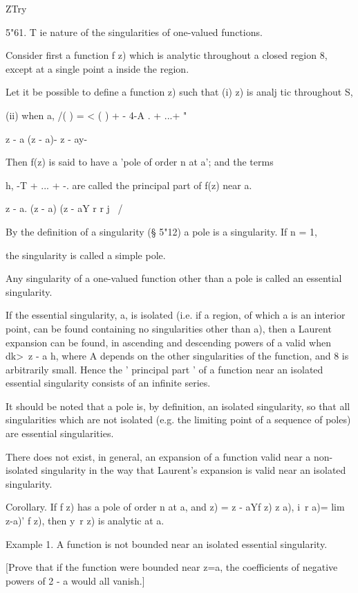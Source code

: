 {{{{ZTry

5"61. T ie nature of the singularities of one-valued functions.

Consider first a function f z) which is analytic throughout a closed
region 8, except at a single point a inside the region.

Let it be possible to define a function z) such that (i) z) is analj
tic throughout S,

(ii) when a, /( ) = < ( ) + - 4-A . + ...+ "

z - a (z - a)- z - ay-

Then f(z) is said to have a 'pole of order n at a'; and the terms

h, -T + ... + -. are called the principal part of f(z) near a.

z - a. (z - a) (z - aY r r j \ /

By the definition of a singularity (§ 5"12) a pole is a singularity.
If n = 1,

the singularity is called a simple pole.

Any singularity of a one-valued function other than a pole is called
an essential singularity.

If the essential singularity, a, is isolated (i.e. if a region, of
which a is an interior point, can be found containing no singularities
other than a), then a Laurent expansion can be found, in ascending and
descending powers of a valid when dk>\ z - a h, where A depends on the
other singularities of the function, and 8 is arbitrarily small. Hence
the ' principal part ' of a function near an isolated essential
singularity consists of an infinite series.

It should be noted that a pole is, by definition, an isolated
singularity, so that all singularities which are not isolated (e.g.
the limiting point of a sequence of poles) are essential
singularities.

There does not exist, in general, an expansion of a function valid
near a non-isolated singularity in the way that Laurent's expansion is
valid near an isolated singularity.

Corollary. If f z) has a pole of order n at a, and z) = z - aYf z) z
a), i\ r a)= lim z-a)' f z), then y\ r z) is analytic at a.

Example 1. A function is not bounded near an isolated essential
singularity.

[Prove that if the function were bounded near z=a, the coefficients of
negative powers of 2 - a would all vanish.]

}}}}
